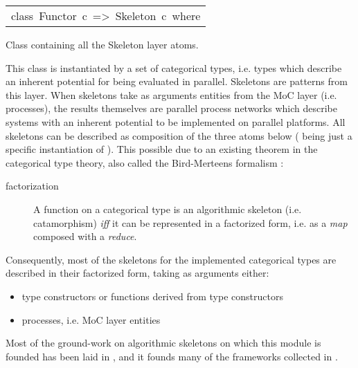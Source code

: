 \begin{haddockdesc}
\item[\begin{tabular}{@{}l}
class\ Functor\ c\ =>\ Skeleton\ c\ where
\end{tabular}]\haddockbegindoc
Class containing all the Skeleton layer atoms.\par
This class is instantiated by a set of categorical types,
 i.e. types which describe an inherent potential for being evaluated
 in parallel. Skeletons are patterns from this layer. When skeletons
 take as arguments entities from the MoC layer (i.e. processes), the
 results themselves are parallel process networks which describe
 systems with an inherent potential to be implemented on parallel
 platforms. All skeletons can be described as composition of the
 three atoms below (\haddockid{=<<=} being just a specific instantiation of
 ). This possible due to an existing theorem in the categorical
 type theory, also called the Bird-Merteens formalism
 \cite{Bird97}:\par
\par
\begin{description}
\item[factorization] A function on a categorical type is an algorithmic
 skeleton (i.e. catamorphism) \emph{iff} it can be represented in a
 factorized form, i.e. as a \emph{map} composed with a \emph{reduce}.
\end{description}Consequently, most of the skeletons for the implemented categorical
 types are described in their factorized form, taking as arguments
 either:\par
                 \begin{itemize}
                 \item
                 type constructors or functions derived from type constructors\par
                 
                 \item
                 processes, i.e. MoC layer entities\par
                 
                 \end{itemize}
                 Most of the ground-work on algorithmic skeletons on which this
 module is founded has been laid in \cite{Bird97},
 \cite{Skillicorn05} and it founds many
 of the frameworks collected in \cite{Gorlatch03}.\par
                 

\end{haddockdesc}
